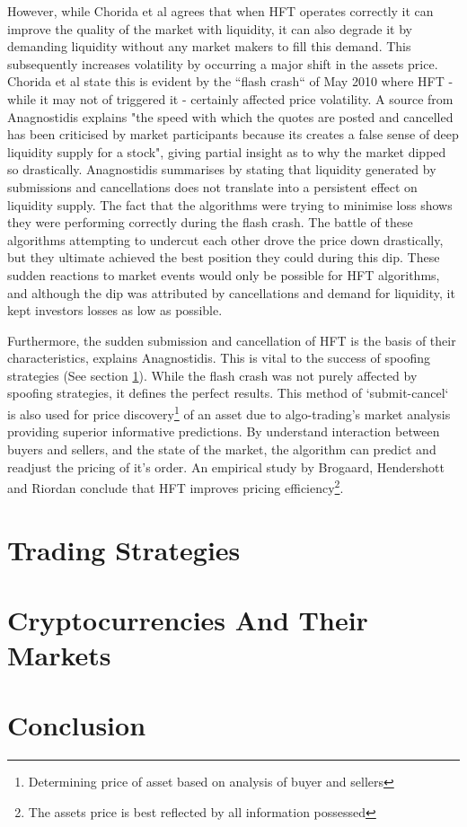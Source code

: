 However, while Chorida et al \cite{REPORT:ChordiaEtAl:2013} agrees that when HFT operates correctly it can improve the quality of the market with liquidity, it can also degrade it by demanding liquidity without any market makers to fill this demand. This subsequently increases volatility by occurring a major shift in the assets price. Chorida et al state this is evident by the ``flash crash`` of May 2010 where HFT - while it may not of triggered it - certainly affected price volatility. A source from Anagnostidis \cite{UNPUB:Anagnostidis:2017} explains "the speed with which the quotes are posted and cancelled has been criticised by market participants because its creates a false sense of deep liquidity supply for a stock", giving partial insight as to why the market dipped so drastically. Anagnostidis summarises by stating that liquidity generated by submissions and cancellations does not translate into a persistent effect on liquidity supply. The fact that the algorithms were trying to minimise loss shows they were performing correctly during the flash crash. The battle of these algorithms attempting to undercut each other drove the price down drastically, but they ultimate achieved the best position they could during this dip. These sudden reactions to market events would only be possible for HFT algorithms, and although the dip was attributed by cancellations and demand for liquidity, it kept investors losses as low as possible.

Furthermore, the sudden submission and cancellation of HFT is the basis of their characteristics, explains Anagnostidis. This is vital to the success of spoofing strategies (See section \ref{sec:related:tradingStrategies}). While the flash crash was not purely affected by spoofing strategies, it defines the perfect results. This method of `submit-cancel` is also used for price discovery\footnote{Determining price of asset based on analysis of buyer and sellers} of an asset due to algo-trading's market analysis providing superior informative predictions. By understand interaction between buyers and sellers, and the state of the market, the algorithm can predict and readjust the pricing of it's order. An empirical study by Brogaard, Hendershott and Riordan \cite{UNPUB:Brogaard:2017} conclude that HFT improves pricing efficiency\footnote{The assets price is best reflected by all information possessed}. 


\section{Trading Strategies}
\label{sec:related:tradingStrategies}


\section{Cryptocurrencies And Their Markets}
\label{sec:related:cryptoAndTheirMarkets}


\section{Conclusion}
\label{sec:related:conclusion}

